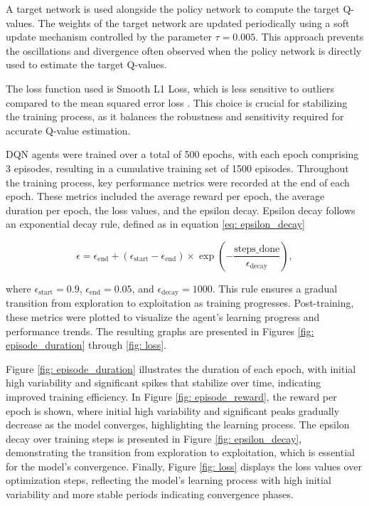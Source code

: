 A target network is used alongside the policy network to compute the target Q-values. The weights of the target network are updated periodically using a soft update mechanism controlled by the parameter $\tau = 0.005$. This approach prevents the oscillations and divergence often observed when the policy network is directly used to estimate the target Q-values. \cite{mnih2013playingatarideepreinforcement}

The loss function used is Smooth L1 Loss, which is less sensitive to outliers compared to the mean squared error loss \cite{hastie-2009}.
This choice is crucial for stabilizing the training process, as it balances the robustness and sensitivity required for accurate Q-value estimation.


DQN agents were trained over a total of 500 epochs, with each epoch comprising 3 episodes, resulting in a cumulative training set of 1500 episodes. Throughout the training process, key performance metrics were recorded at the end of each epoch. These metrics included the average reward per epoch, the average duration per epoch, the loss values, and the epsilon decay. Epsilon decay follows an exponential decay rule, defined as in equation \ref{eq: epsilon_decay}

\begin{equation} \label{eq: epsilon_decay}
\epsilon = \epsilon_{\text{end}} + (\epsilon_{\text{start}} - \epsilon_{\text{end}}) \times \exp\left(-\frac{\text{steps\_done}}{\epsilon_{\text{decay}}}\right),
\end{equation}

where \(\epsilon_{\text{start}} = 0.9\), \(\epsilon_{\text{end}} = 0.05\), and \(\epsilon_{\text{decay}} = 1000\). This rule ensures a gradual transition from exploration to exploitation as training progresses. Post-training, these metrics were plotted to visualize the agent's learning progress and performance trends. The resulting graphs are presented in Figures \ref{fig: episode_duration} through \ref{fig: loss}.

Figure \ref{fig: episode_duration} illustrates the duration of each epoch, with initial high variability and significant spikes that stabilize over time, indicating improved training efficiency. In Figure \ref{fig: episode_reward}, the reward per epoch is shown, where initial high variability and significant peaks gradually decrease as the model converges, highlighting the learning process. The epsilon decay over training steps is presented in Figure \ref{fig: epsilon_decay}, demonstrating the transition from exploration to exploitation, which is essential for the model's convergence. Finally, Figure \ref{fig: loss} displays the loss values over optimization steps, reflecting the model's learning process with high initial variability and more stable periods indicating convergence phases.


